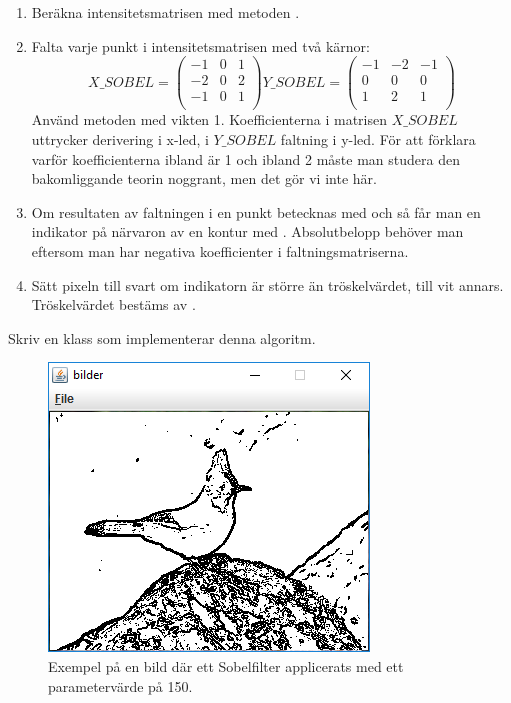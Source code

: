 \begin{enumerate} 
	\item Beräkna intensitetsmatrisen med metoden .
	\item Falta varje punkt i intensitetsmatrisen med två kärnor:
$$
X\_SOBEL =
\begin{pmatrix}
  -1 & 0 & 1 \\
  -2 & 0 & 2 \\
  -1 & 0 & 1 \\
\end{pmatrix}
Y\_SOBEL =
\begin{pmatrix}
  -1 & -2 & -1 \\
  0 & 0 & 0 \\
  1 & 2 & 1 \\
\end{pmatrix}
$$
	Använd metoden  med vikten 1. Koefficienterna i matrisen $X\_SOBEL$ uttrycker derivering i x-led, i $Y\_SOBEL$ faltning i y-led. För att förklara varför koefficienterna ibland är 1 och ibland 2 måste man studera den bakomliggande teorin noggrant, men det gör vi inte här.
	\item Om resultaten av faltningen i en punkt betecknas med  och  så får man en indikator på närvaron av en kontur med . Absolutbelopp behöver man eftersom man har negativa koefficienter i faltningsmatriserna. 
	\item  Sätt pixeln till svart om indikatorn är större än tröskelvärdet, till vit annars. Tröskelvärdet bestäms av . 
\end{enumerate}

Skriv en klass  som implementerar denna algoritm.

\begin{figure}[H]
\begin{center}
\includegraphics[scale=0.8]{../img/w13-assignment-imageprocessing/sobeljay.png}
\caption { Exempel på en bild där ett Sobelfilter applicerats med ett parametervärde på 150.}
\label{fig:sobel}
\end{center}
\end{figure}



